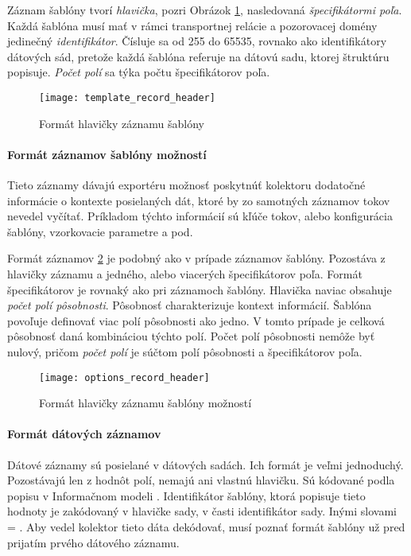 Záznam šablóny tvorí \emph{hlavička}, pozri Obrázok \ref{o:template_record_header}, nasledovaná 
\emph{špecifikátormi poľa}. 
Každá šablóna musí mať v rámci transportnej relácie a pozorovacej domény jedinečný \emph{identifikátor}. 
Čísluje sa od 255 do 65535, rovnako ako identifikátory dátových sád, pretože každá šablóna referuje 
na dátovú sadu, ktorej štruktúru popisuje. \emph{Počet polí} sa týka počtu 
špecifikátorov poľa.

\begin{figure}[ht!]
\centering
\texttt{[image: template\_record\_header]}
\caption{Formát hlavičky záznamu šablóny}\label{o:template_record_header}
\end{figure}



\paragraph{Formát záznamov šablóny možností}

Tieto záznamy dávajú exportéru možnosť poskytnúť kolektoru dodatočné informácie o kontexte posielaných dát, 
ktoré by zo samotných 
záznamov tokov nevedel vyčítať. Príkladom týchto informácií sú kľúče tokov, alebo konfigurácia šablóny,
vzorkovacie parametre a pod.

Formát záznamov \ref{o:options_record_header} je podobný ako v prípade záznamov šablóny. Pozostáva z hlavičky záznamu 
a jedného, alebo viacerých špecifikátorov poľa. Formát špecifikátorov je rovnaký ako pri záznamoch šablóny.
Hlavička naviac obsahuje \emph{počet polí pôsobnosti}. Pôsobnosť charakterizuje kontext 
informácií. Šablóna povoľuje 
definovať viac polí pôsobnosti ako jedno. V tomto prípade je celková pôsobnosť daná kombináciou týchto polí.
Počet polí pôsobnosti nemôže byť nulový, pričom \emph{počet polí} je 
súčtom polí pôsobnosti a špecifikátorov poľa.\citep{rfc5102}

\begin{figure}[ht!]
\centering
\texttt{[image: options\_record\_header]}
\caption{Formát hlavičky záznamu šablóny možností}\label{o:options_record_header}
\end{figure}



\paragraph{Formát dátových záznamov}

Dátové záznamy sú posielané v dátových sadách. Ich formát je veľmi 
jednoduchý. Pozostávajú len z hodnôt polí, nemajú ani vlastnú hlavičku. 
Sú kódované podla popisu v Informačnom modeli \citep{rfc5102}. Identifikátor 
šablóny, ktorá popisuje tieto hodnoty je zakódovaný v hlavičke sady, v časti
identifikátor sady. Inými slovami  = . Aby vedel kolektor tieto dáta dekódovať, musí poznať formát šablóny 
už pred prijatím prvého dátového záznamu.


